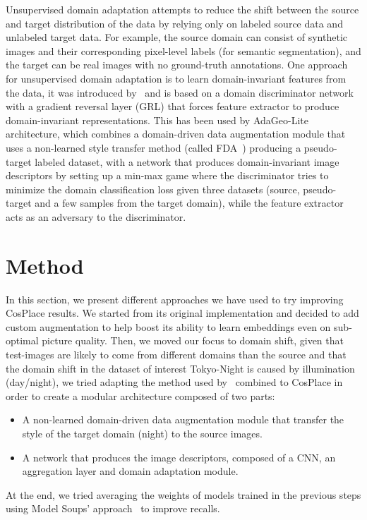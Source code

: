 \documentclass[10pt,twocolumn,letterpaper]{article}
\begin{document}
Unsupervised domain adaptation attempts to reduce the shift between the source and target distribution of the data by relying only on labeled source data and unlabeled target data. For example, the source domain can consist of synthetic images and their corresponding pixel-level labels (\eg for semantic segmentation), and the target can be real images with no ground-truth annotations. One approach for unsupervised domain adaptation is to learn domain-invariant features from the data, it was introduced by~\cite{grl} and is based on a domain discriminator network with a gradient reversal layer (GRL) that forces feature extractor to produce domain-invariant representations. This has been used by AdaGeo-Lite~\cite{adageo} architecture, which combines a domain-driven data augmentation module that uses a non-learned style transfer method (called FDA~\cite{fda}) producing a pseudo-target labeled dataset, with a network that produces domain-invariant image descriptors by setting up a min-max game where the discriminator tries to minimize the domain classification loss given three datasets (source, pseudo-target and a few samples from the target domain), while the feature extractor acts as an adversary to the discriminator.
\section{Method}\label{sec:experiments}
In this section, we present different approaches we have used to try improving CosPlace results. We started from its original implementation and decided to add custom augmentation to help boost its ability to learn embeddings even on sub-optimal picture quality. Then, we moved our focus to domain shift, given that test-images are likely to come from different domains than the source and that the domain shift in the dataset of interest Tokyo-Night is caused by illumination (day/night), we tried adapting the method used by~\cite{adageo} combined to CosPlace in order to create a modular architecture composed of two parts:
\begin{itemize}
    \item A non-learned domain-driven data augmentation module that transfer the style of the target domain (night) to the source images.
    \item A network that produces the image descriptors, composed of a CNN, an aggregation layer and domain adaptation module.
\end{itemize}
At the end, we tried averaging the weights of models trained in the previous steps using Model Soups' approach~\cite{modelsoup} to improve recalls.
\end{document}
